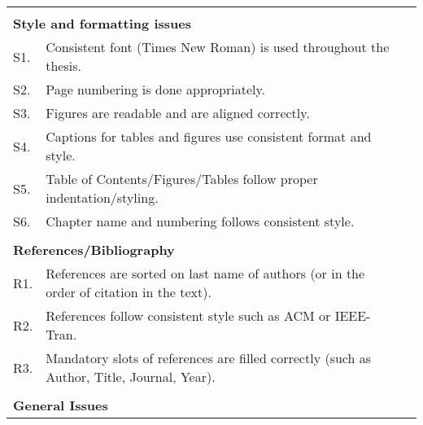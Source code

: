 \begin{table}[!ht]
\begin{adjustbox}{width=\linewidth,center}
\begin{tabular}{p{0.6cm}p{9cm}p{0.6cm}}
               &                                                                                                                 &  \\
\multicolumn{2}{l}{\textbf{Style and formatting issues}}                                                                         &  \\
S1.            & Consistent font (Times New Roman) is   used throughout the thesis.                                              &  \\
S2.            & Page numbering is   done appropriately.                                                                         &  \\
S3.            & Figures are readable   and are aligned correctly.                                                               &  \\
S4.            & Captions for tables   and figures use consistent format and style.                                              &  \\
S5.            & Table of   Contents/Figures/Tables follow proper indentation/styling.                                           &  \\
S6.            & Chapter name and   numbering follows consistent style.                                                          &  \\
               &                                                                                                                 &  \\
\multicolumn{2}{l}{\textbf{References/Bibliography}}                                                                             &  \\
R1.            & References are   sorted on last name of authors (or in the order of citation in the text).                      &  \\
R2.            & References follow   consistent style such as ACM or IEEE-Tran.                                                  &  \\
R3.            & Mandatory slots of   references are filled correctly (such as Author, Title, Journal, Year).                    &  \\
               &                                                                                                                 &  \\
\multicolumn{2}{l}{\textbf{General Issues}}                                                                                      &  \\

\end{tabular}
\end{adjustbox}
\end{table}
